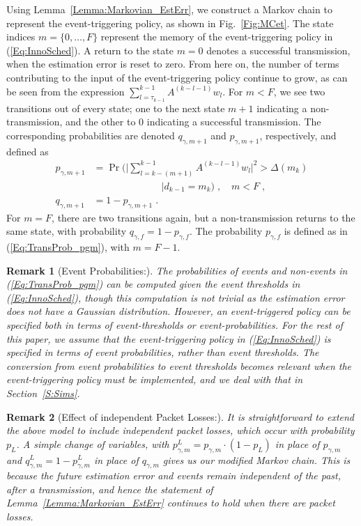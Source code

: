 \documentclass[journal]{IEEEtran}
\newtheorem{remark}{Remark}[section]
\begin{document}
Using Lemma~\ref{Lemma:Markovian_EstErr}, we construct a Markov chain to represent the event-triggering policy, as shown in Fig.~\ref{Fig:MCet}. The state indices $m=\{0,\dots,F\}$ represent the memory of the event-triggering policy in (\ref{Eq:InnoSched}). A return to the state $m=0$ denotes a successful transmission, when the estimation error is reset to zero. From here on, the number of terms contributing to the input of the event-triggering policy continue to grow, as can be seen from the expression $\sum_{l=\tau_{k-1}}^{k-1} A^{(k-l-1)} w_{l}$. For $m<F$, we see two transitions out of every state; one to the next state $m+1$ indicating a non-transmission, and the other to $0$ indicating a successful transmission. The corresponding probabilities are denoted $q_{\gamma,m+1}$ and $p_{\gamma,m+1}$, respectively, and defined as
\begin{equation} \label{Eq:TransProb_pgm}
\begin{aligned}
p_{\gamma,m+1} &= \Pr\bigg( \bigg| \sum_{l=k-(m+1)}^{k-1} A^{(k-l-1)} w_{l} \bigg|^2 > \Delta(m_{k}) \\
& \quad \quad \quad \quad \quad \quad \quad \bigg| d_{k-1}=m_k \bigg) \; , \quad m<F \; , \\
q_{\gamma,m+1} &= 1- p_{\gamma,m+1} \; .
\end{aligned}
\end{equation}
For $m=F$, there are two transitions again, but a non-transmission returns to the same state, with probability $q_{\gamma,f}=1-p_{\gamma,f}$. The probability $p_{\gamma,f}$ is defined as in (\ref{Eq:TransProb_pgm}), with $m = F-1$.

\begin{remark}[Event Probabilities:]
The probabilities of events and non-events in (\ref{Eq:TransProb_pgm}) can be computed given the event thresholds in (\ref{Eq:InnoSched}), though this computation is not trivial as the estimation error does not have a Gaussian distribution. However, an event-triggered policy can be specified both in terms of event-thresholds or event-probabilities. For the rest of this paper, we assume that the event-triggering policy in (\ref{Eq:InnoSched}) is specified in terms of event probabilities, rather than event thresholds. The conversion from event probabilities to event thresholds becomes relevant when the event-triggering policy must be implemented, and we deal with that in Section~\ref{S:Sims}.
\end{remark}

\begin{remark}[Effect of independent Packet Losses:]
It is straightforward to extend the above model to include independent packet losses, which occur with probability $p_L$. A simple change of variables, with $p^{L}_{\gamma,m} = p_{\gamma,m} \cdot (1-p_L)$ in place of $p_{\gamma,m}$ and $q^L_{\gamma,m} = 1 - p^L_{\gamma,m}$ in place of $q_{\gamma,m}$ gives us our modified Markov chain. This is because the future estimation error and events remain independent of the past, after a transmission, and hence the statement of Lemma~\ref{Lemma:Markovian_EstErr} continues to hold when there are packet losses.
\end{remark}
\end{document}
